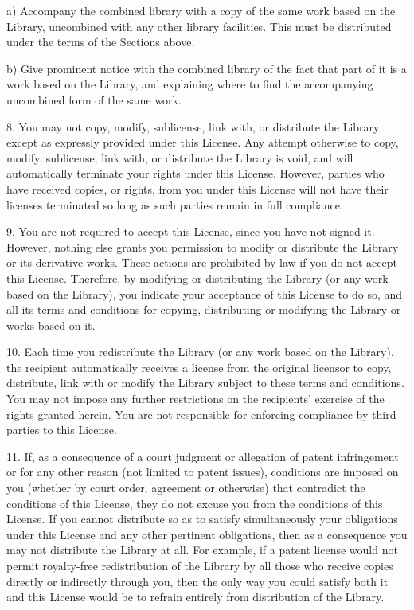 \documentclass[twoside]{tceusermanual}
\begin{document}
    a) Accompany the combined library with a copy of the same work
    based on the Library, uncombined with any other library
    facilities.  This must be distributed under the terms of the
    Sections above.

    b) Give prominent notice with the combined library of the fact
    that part of it is a work based on the Library, and explaining
    where to find the accompanying uncombined form of the same work.

8. You may not copy, modify, sublicense, link with, or
distribute the Library except as expressly provided under this
License.  Any attempt otherwise to copy, modify, sublicense,
link with, or distribute the Library is void, and will
automatically terminate your rights under this License.
However, parties who have received copies, or rights, from you
under this License will not have their licenses terminated so
long as such parties remain in full compliance.

9. You are not required to accept this License, since you have
not signed it.  However, nothing else grants you permission to
modify or distribute the Library or its derivative works.  These
actions are prohibited by law if you do not accept this
License.  Therefore, by modifying or distributing the Library
(or any work based on the Library), you indicate your acceptance
of this License to do so, and all its terms and conditions for
copying, distributing or modifying the Library or works based on
it.

10. Each time you redistribute the Library (or any work based on
the Library), the recipient automatically receives a license
from the original licensor to copy, distribute, link with or
modify the Library subject to these terms and conditions.  You
may not impose any further restrictions on the recipients'
exercise of the rights granted herein. You are not responsible
for enforcing compliance by third parties to this License.
 
11. If, as a consequence of a court judgment or allegation of
patent infringement or for any other reason (not limited to
patent issues), conditions are imposed on you (whether by court
order, agreement or otherwise) that contradict the conditions of
this License, they do not excuse you from the conditions of this
License.  If you cannot distribute so as to satisfy
simultaneously your obligations under this License and any other
pertinent obligations, then as a consequence you may not
distribute the Library at all.  For example, if a patent license
would not permit royalty-free redistribution of the Library by
all those who receive copies directly or indirectly through you,
then the only way you could satisfy both it and this License
would be to refrain entirely from distribution of the Library.
\end{document}
